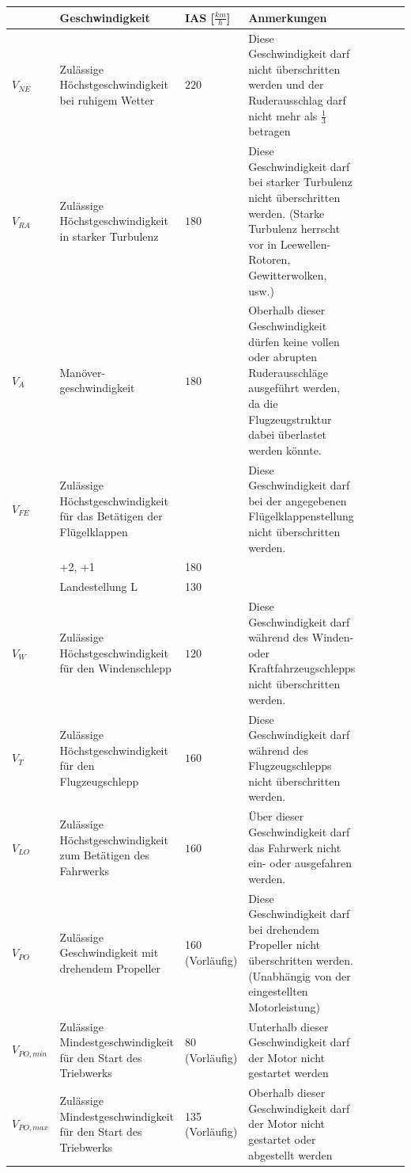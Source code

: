 \begin{longtable}{|p{}|m{}|p{}|m{}|llll}
\hline
& Geschwindigkeit & IAS [$\frac{km}{h}$] & Anmerkungen \\
\hline
$V_{NE}$ & Zulässige Höchstgeschwindigkeit bei ruhigem Wetter & $220$ & Diese Geschwindigkeit darf nicht überschritten werden und der Ruderausschlag darf nicht mehr als $\frac{1}{3}$ betragen\\
\hline
$V_{RA}$ & Zulässige Höchstgeschwindigkeit in starker Turbulenz & $180$ & Diese Geschwindigkeit darf bei starker Turbulenz nicht überschritten werden. (Starke Turbulenz herrscht vor in Leewellen-Rotoren, Gewitterwolken, usw.) \\
\hline
$V_A$ & Manöver-\newline geschwindigkeit & $180$ & Oberhalb dieser Geschwindigkeit dürfen keine vollen oder abrupten Ruderausschläge ausgeführt werden, da die Flugzeugstruktur dabei überlastet werden könnte.\\
\hline
$V_{FE}$ & Zulässige Höchstgeschwindigkeit für das Betätigen der Flügelklappen
&   & Diese Geschwindigkeit darf bei der angegebenen Flügelklappenstellung nicht überschritten werden.\\
& +2, +1 & 180 & \\
& Landestellung L & 130 & \\
\hline
$V_W$ & Zulässige Höchstgeschwindigkeit für den Windenschlepp & $120$ & Diese Geschwindigkeit darf während des Winden- oder Kraftfahrzeugschlepps nicht überschritten werden.\\
\hline
$V_T$ & Zulässige Höchstgeschwindigkeit für den Flugzeugschlepp & $160$ & Diese Geschwindigkeit darf während des Flugzeugschlepps nicht überschritten werden.\\
\hline
$V_{LO}$ & Zulässige Höchstgeschwindigkeit zum Betätigen des Fahrwerks & $160$ & Über dieser Geschwindigkeit darf das Fahrwerk nicht ein- oder ausgefahren werden.\\
\hline
$V_{PO}$ & Zulässige Geschwindigkeit mit drehendem Propeller & 160 (Vorläufig) & Diese Geschwindigkeit darf bei drehendem Propeller nicht überschritten werden. (Unabhängig von der eingestellten Motorleistung)\\
\hline
$V_{PO,min}$ & Zulässige Mindestgeschwindigkeit für den Start des Triebwerks & 80 (Vorläufig) & Unterhalb dieser Geschwindigkeit darf der Motor nicht gestartet werden\\
\hline
$V_{PO,max}$ & Zulässige Mindestgeschwindigkeit für den Start des Triebwerks & 135 (Vorläufig) & Oberhalb dieser Geschwindigkeit darf der Motor nicht gestartet oder abgestellt werden\\
\hline
\end{longtable}


